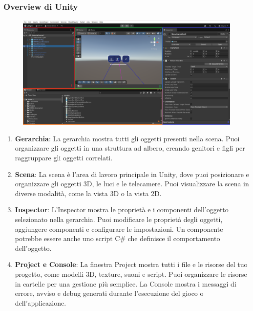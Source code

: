 \subsubsection{Overview di Unity} 
\begin{figure}[H]
    \centering
    \includegraphics[width=\textwidth,height=\textheight,keepaspectratio]{figures/chapter_1/unityOverview.png}
\end{figure}
\begin{enumerate}
    \item \textbf{Gerarchia}: La gerarchia mostra tutti gli oggetti presenti nella scena. Puoi organizzare gli oggetti in una struttura ad albero, creando genitori e figli per raggruppare gli oggetti correlati.
    \item \textbf{Scena}: La scena è l'area di lavoro principale in Unity, dove puoi posizionare e organizzare gli oggetti 3D, le luci e le telecamere. Puoi visualizzare la scena in diverse modalità, come la vista 3D o la vista 2D.
    \item \textbf{Inspector}: L'Inspector mostra le proprietà e i componenti dell'oggetto selezionato nella gerarchia. Puoi modificare le proprietà degli oggetti, aggiungere componenti e configurare le impostazioni. Un componente potrebbe essere anche uno script C\# che definisce il comportamento dell'oggetto.
    \item \textbf{Project e Console}: La finestra Project mostra tutti i file e le risorse del tuo progetto, come modelli 3D, texture, suoni e script. Puoi organizzare le risorse in cartelle per una gestione più semplice. La Console mostra i messaggi di errore, avviso e debug generati durante l'esecuzione del gioco o dell'applicazione.
\end{enumerate}

